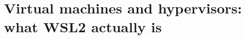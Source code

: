 \chapter{Virtual machines and hypervisors: what WSL2 actually is}
\label{ch:virtual-machines-and-hypervisors-what}

